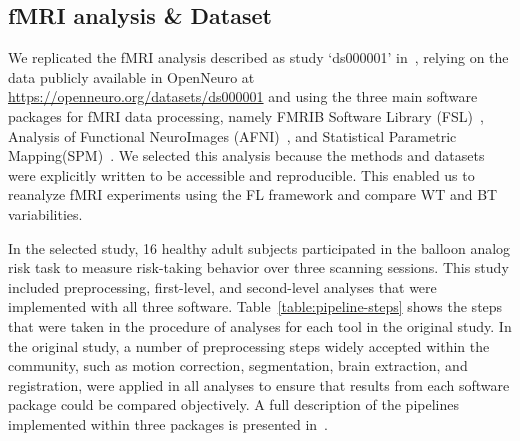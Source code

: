\documentclass[conference]{IEEEtran}
\begin{document}
\subsection{fMRI analysis \& Dataset}

We replicated the fMRI analysis described as study `ds000001' in~\cite{bowring2019exploring}, relying on
the data publicly available in OpenNeuro at \url{https://openneuro.org/datasets/ds000001}
and using the three main software packages for fMRI data processing, namely
FMRIB Software Library (FSL)~\cite{jenkinson2012fsl}, Analysis of Functional NeuroImages (AFNI)~\cite{cox1996afni},
and Statistical Parametric Mapping(SPM)~\cite{penny2011statistical}.
We selected this analysis because the methods and datasets were explicitly
written to be accessible and reproducible. This enabled us to reanalyze fMRI experiments using the FL framework and
compare WT and BT variabilities.

In the selected study, 16 healthy adult subjects participated in the balloon analog risk task to measure
risk-taking behavior over three scanning sessions.
This study included preprocessing, first-level, and second-level analyses that were implemented with all three software.
Table~\ref{table:pipeline-steps} shows the steps that were taken in the procedure of analyses for each tool in the original study.
In the original study, a number of preprocessing steps widely accepted within the community, such as motion correction,
segmentation, brain extraction, and registration, were applied in all analyses to ensure that results from each software
package could be compared objectively.
A full description of the pipelines implemented within three packages is presented in~\cite{bowring2019exploring,schonberg2012decreasing}.
\end{document}
